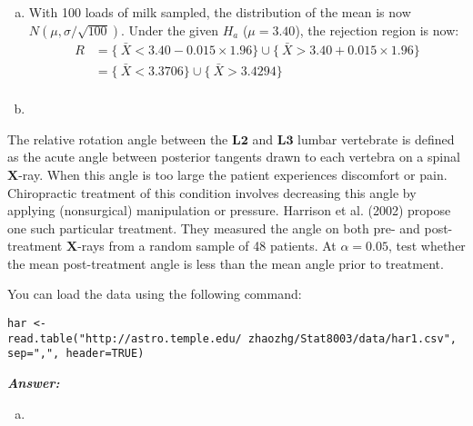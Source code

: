 \documentclass[12pt]{article}
\newenvironment{question}[2][Question]{\begin{trivlist}
\item[\hskip \labelsep {\bfseries #1}\hskip \labelsep {\bfseries #2.}]}{\end{trivlist}}
\begin{document}
\begin{enumerate}[(a)]
\item With 100 loads of milk sampled, the distribution of the mean is now $N(\mu, \sigma / \sqrt{ 100})$. Under the given $H_a$ ($\mu = 3.40$), the rejection region is now:
 \begin{align*}
R &=  \Big\{  \ \bar X < 3.40 - 0.015 \times 1.96 \Big\}  \cup \Big\{ \ \bar X >  3.40 + 0.015 \times 1.96 \Big\} \\
&= \Big\{  \ \bar X < 3.3706  \Big\}  \cup \Big\{ \ \bar X > 3.4294 \Big\} \\
\end{align*}

\item

\end{enumerate}
\bigskip
\bigskip
 \begin{question}{7.2}  The relative rotation angle between the $\mathbf{L2}$ and $\mathbf{L3}$  lumbar vertebrate is defined as the acute
angle between posterior tangents drawn to each vertebra on a spinal $\mathbf{X}$-ray. When this angle is too
large the patient experiences discomfort or pain. Chiropractic treatment of this condition involves
decreasing this angle by applying (nonsurgical) manipulation or pressure. Harrison et al. (2002)
propose one such particular treatment. They measured the angle on both pre- and post-treatment
$\mathbf{X}$-rays from a random sample of 48 patients. At $\alpha = 0.05$, test whether the mean post-treatment
angle is less than the mean angle prior to treatment.


You can load the data using the following command:


\texttt{har <- read.table("http://astro.temple.edu/~zhaozhg/Stat8003/data/har1.csv", sep=",", header=TRUE)}
\end{question} 

  \textbf{\color{TealBlue}\emph{Answer:} } 

\begin{enumerate}[(a)]

\item 
\end{enumerate}
\end{document}
